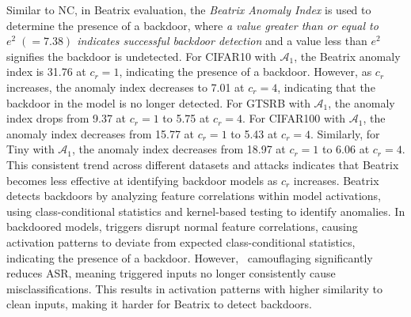 Similar to NC, in Beatrix evaluation, the \textit{Beatrix Anomaly Index} is used to determine the presence of a backdoor, where \textit{a value greater than or equal to $e^2\;(=7.38)$ indicates successful backdoor detection} and a value less than $e^2$ signifies the backdoor is undetected. For CIFAR10 with $\mathcal{A}_1$, the Beatrix anomaly index is 31.76 at $c_r = 1$, indicating the presence of a backdoor. However, as $c_r$ increases, the anomaly index decreases to 7.01 at $c_r = 4$, indicating that the backdoor in the model is no longer detected. For GTSRB with $\mathcal{A}_1$, the anomaly index drops from 9.37 at $c_r = 1$ to 5.75 at $c_r = 4$. For CIFAR100 with $\mathcal{A}_1$, the anomaly index decreases from 15.77 at $c_r = 1$ to 5.43 at $c_r = 4$. Similarly, for Tiny with $\mathcal{A}_1$, the anomaly index decreases from 18.97 at $c_r = 1$ to 6.06 at $c_r = 4$. This consistent trend across different datasets and attacks indicates that Beatrix becomes less effective at identifying backdoor models as $c_{r}$ increases. Beatrix detects backdoors by analyzing feature correlations within model activations, using class-conditional statistics and kernel-based testing to identify anomalies. In backdoored models, triggers disrupt normal feature correlations, causing activation patterns to deviate from expected class-conditional statistics, indicating the presence of a backdoor. However, \methodname~camouflaging significantly reduces ASR, meaning triggered inputs no longer consistently cause misclassifications. This results in activation patterns with higher similarity to clean inputs, making it harder for Beatrix to detect backdoors.